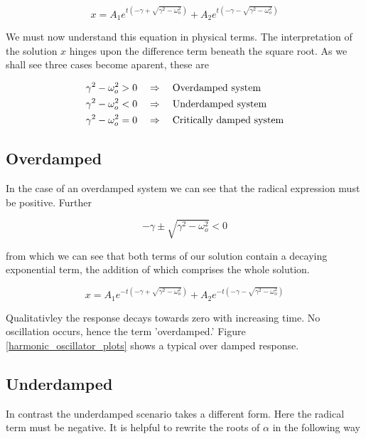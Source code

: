 \documentclass[11pt]{book}
\begin{document}
\begin{equation*}
  x = A_1e^{t\left(-\gamma + \sqrt{\gamma^2 - \omega_o^2}\right)} + A_2e^{t\left(-\gamma - \sqrt{\gamma^2 - \omega_o^2}\right)}
\end{equation*}

We must now understand this equation in physical terms.  The
interpretation of the solution $x$ hinges upon the difference term
beneath the square root.  As we shall see three cases become aparent,
these are


    \begin{align*}
      \gamma^2 - \omega_o^2 &> 0 \text{\quad} \Rightarrow \text{\quad Overdamped system}\\
      \gamma^2 - \omega_o^2 &< 0 \text{\quad} \Rightarrow \text{\quad Underdamped system}\\
      \gamma^2 - \omega_o^2 &= 0 \text{\quad} \Rightarrow \text{\quad Critically damped system}
    \end{align*}
    
\subsection*{Overdamped}

In the case of an overdamped system we can see that the radical
expression must be positive.  Further

\begin{equation*}
  -\gamma \pm \sqrt{\gamma^2 - \omega_o^2} < 0
\end{equation*}

from which we can see that both terms of our solution contain a
decaying exponential term, the addition of which comprises the whole
solution.

\begin{equation*}
  x = A_1e^{-t(-\gamma + \sqrt{\gamma^2 - \omega_o^2})}  + A_2e^{-t(-\gamma - \sqrt{\gamma^2 - \omega_o^2})}
\end{equation*}

Qualitativley the response decays towards
zero with increasing time.  No oscillation occurs, hence the term
'overdamped.' Figure \ref{harmonic_oscillator_plots} shows a typical over
damped response.


\subsection* {Underdamped}

In contrast the underdamped scenario takes a different form.  Here the
radical term must be negative.  It is helpful to rewrite the roots of
$\alpha$ in the following way
\end{document}
